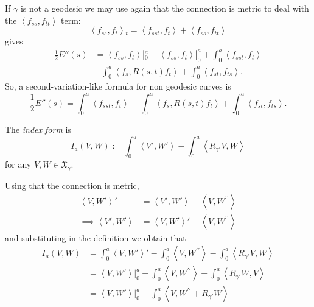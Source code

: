 \begin{remark}
\label{remark-second-variation-non-geodesic}
If $\gamma$ is not a geodesic we may
use again that the connection
is metric to deal with the
$\left\langle{}f_{ss},f_{tt}\right\rangle{}$ term:
$$
\left\langle{}f_{ss},f_t\right\rangle{}_t
=\left\langle{}f_{ss t},f_{t}\right\rangle{}
+\left\langle{}f_{ss},f_{tt}\right\rangle{}
$$
gives
$$
\begin{aligned}
\frac{1}{2}E''(s)&=
\left\langle{}f_{ss},f_t\right\rangle{}|_{0}^a
-\left\langle{}f_{ss},f_t\right\rangle{}|_0^a
+\int_0^a \left\langle{}f_{ss t},f_t\right\rangle{}\\
&-\int_0^a\left\langle{}f_s,R(s,t)f_t\right\rangle{}
+\int_0^a\left\langle{}f_{s t},f_{t s}\right\rangle{}.
\end{aligned}
$$
So, a second-variation-like formula 
for non geodesic curves is
$$
\frac{1}{2}E''(s)=
\int_0^a \left\langle{}f_{ss t},f_t\right\rangle{}
-\int_0^a\left\langle{}f_s,R(s,t)f_t\right\rangle{}
+\int_0^a\left\langle{}f_{s t},f_{t s}\right\rangle{}.
$$
\end{remark}

\begin{definition}
\label{definition-index-form}
The {\it index form} is
\begin{equation}
\label{equation-index-form}
I_a(V,W):=\int_0^a
\left\langle{}V',W'\right\rangle{}-\int_0^a\left\langle{}R_{\gamma'}V,
W\right\rangle{}
\end{equation}
for any $V,W \in \mathfrak{X}_\gamma$.
\end{definition}

\begin{remark}
\label{remark-index-form-alternative-formula}
Using that the connection is metric,
$$
\begin{aligned}
\left\langle{}V,W'\right\rangle{}'&=\left\langle{}V',W'\right\rangle{}+
\left\langle{}V,W^{\prime\prime}\right\rangle{}\\
\implies
\left\langle{}V',W'\right\rangle{}&=\left\langle{}V,W'\right\rangle{}'-
\left\langle{}V,W^{\prime\prime}\right\rangle{}
\end{aligned}
$$
and substituting in the definition we obtain
that
\begin{equation}
\label{equation-index-form-alter-formu}
\begin{aligned}
I_a(V,W)&=\int_0^a\left\langle{}V,W'\right\rangle{}'-\int_0^a
\left\langle{}V,W^{\prime\prime}\right\rangle{}-\int_0^a
\left\langle{}R_{\gamma'}V,W\right\rangle{}\\
&=\left\langle{}V,W'\right\rangle{}|_{0}^a-\int_0^a
\left\langle{}V,W^{\prime\prime}\right\rangle{}-\int_0^a\left\langle{}R_{\gamma'}
W,V\right\rangle{}\\
&=\left\langle{}V,W'\right\rangle{}|_{0}^a-\int_0^a
\left\langle{}V,W^{\prime\prime}+R_{\gamma'}W\right\rangle{}
\end{aligned}
\end{equation}
\end{remark}

